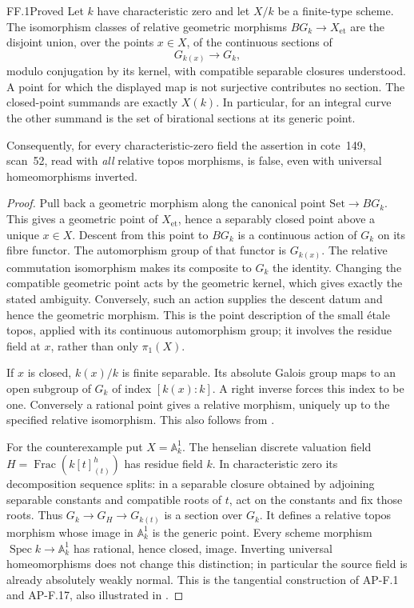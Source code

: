 \begin{claim}{FF.1}{Proved}\label{clm:FF1}
Let \(k\) have characteristic zero and let \(X/k\) be a finite-type
scheme. The isomorphism classes of relative geometric morphisms
\(BG_k\to X_{\mathrm{et}}\) are the disjoint union, over the points
\(x\in X\), of the continuous sections of
\[
                 G_{k(x)}\longrightarrow G_k,
\]
modulo conjugation by its kernel, with compatible separable closures
understood. A point for which the displayed map is not surjective
contributes no section. The closed-point summands are exactly
\(X(k)\). In particular, for an integral curve the other summand is
the set of birational sections at its generic point.

Consequently, for every characteristic-zero field the assertion in
cote~149, scan~52, read with \emph{all} relative topos morphisms, is
false, even with universal homeomorphisms inverted.
\end{claim}
\begin{proof}
Pull back a geometric morphism along the canonical point
\(\mathrm{Set}\to BG_k\). This gives a geometric point of
\(X_{\mathrm{et}}\), hence a separably closed point above a unique
\(x\in X\). Descent from this point to \(BG_k\) is a continuous
action of \(G_k\) on its fibre functor. The automorphism group of
that functor is \(G_{k(x)}\). The relative commutation isomorphism
makes its composite to \(G_k\) the identity. Changing the compatible
geometric point acts by the geometric kernel, which gives exactly the
stated ambiguity. Conversely, such an action supplies the descent
datum and hence the geometric morphism. This is the point description
of the small \'etale topos, applied with its continuous automorphism
group; it involves the residue field at \(x\), rather than only
\(\pi_1(X)\).

If \(x\) is closed, \(k(x)/k\) is finite separable. Its absolute
Galois group maps to an open subgroup of \(G_k\) of index
\([k(x):k]\). A right inverse forces this index to be one. Conversely
a rational point gives a relative morphism, uniquely up to the
specified relative isomorphism. This also follows from
\citet[Proposition~3.6]{FF_CHW2024}.

For the counterexample put \(X=\mathbb A^1_k\). The henselian
discrete valuation field \(H=\operatorname{Frac}(k[t]^h_{(t)})\)
has residue field \(k\). In characteristic zero its decomposition
sequence splits: in a separable closure obtained by adjoining
separable constants and compatible roots of \(t\), act on the
constants and fix those roots. Thus
\(G_k\to G_H\to G_{k(t)}\) is a section over \(G_k\).
It defines a relative topos morphism whose image in \(\mathbb A^1_k\)
is the generic point. Every scheme morphism
\(\operatorname{Spec}k\to\mathbb A^1_k\) has rational, hence closed,
image. Inverting universal homeomorphisms does not change this
distinction; in particular the source field is already absolutely
weakly normal. This is the tangential construction of AP-F.1 and
AP-F.17, also illustrated in \citet[Example~2.30]{FF_CHW2024}.
\end{proof}


